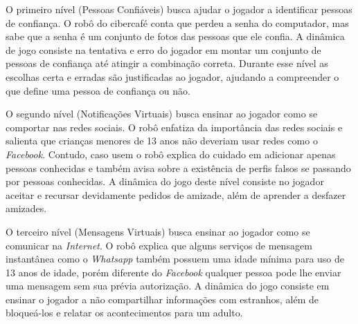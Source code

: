 O primeiro nível (Pessoas Confiáveis) busca ajudar o jogador a identificar pessoas de confiança. O robô do cibercafé conta que perdeu a senha do computador, mas sabe que a senha é um conjunto de fotos das pessoas que ele confia. A dinâmica de jogo consiste na tentativa e erro do jogador em montar um conjunto de pessoas de confiança até atingir a combinação correta. Durante esse nível as escolhas certa e erradas são justificadas ao jogador, ajudando a compreender o que define uma pessoa de confiança ou não. 

O segundo nível (Notificações Virtuais) busca ensinar ao jogador como se comportar nas redes sociais. O robô enfatiza da importância das redes sociais e salienta que crianças menores de 13 anos não deveriam usar redes como o \textit{Facebook}. Contudo, caso usem o robô explica do cuidado em adicionar apenas pessoas conhecidas e também avisa sobre a existência de perfis falsos se passando por pessoas conhecidas. A dinâmica do jogo deste nível consiste no jogador aceitar e recursar devidamente pedidos de amizade, além de aprender a desfazer amizades. %

O terceiro nível (Mensagens Virtuais) busca ensinar ao jogador como se comunicar na \textit{Internet}. O robô explica que alguns serviços de mensagem instantânea como o \textit{Whatsapp} também possuem uma idade mínima para uso de 13 anos de idade, porém diferente do \textit{Facebook} qualquer pessoa pode lhe enviar uma mensagem sem sua prévia autorização. A dinâmica do jogo consiste em ensinar o jogador a não compartilhar informações com estranhos, além de bloqueá-los e relatar os acontecimentos para um adulto. %


